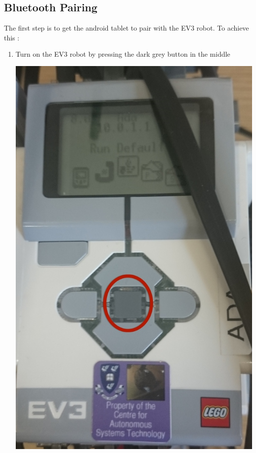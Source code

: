 \documentclass[]{article}   	%
\begin{document}
\subsection{Bluetooth Pairing}
\par{The first step is to get the android tablet to pair with the EV3 robot. To achieve this :
\begin{enumerate}
	\item Turn on the EV3 robot by pressing the dark grey button in the middle\\
		\begin{center}
			\includegraphics[scale=0.2]{graybtn.JPG}
		\end{center}		

\end{enumerate}}
\end{document}
